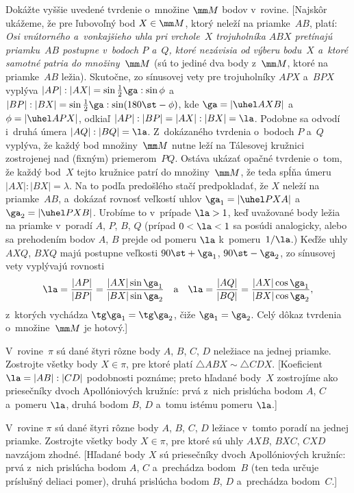 {Dokážte vyššie uvedené tvrdenie o~množine $\mm M$ bodov v~rovine.
[Najskôr ukážeme, že pre ľubovoľný bod $X\in\mm M$, ktorý neleží
na priamke~$AB$, platí:
{\sl Osi vnútorného a~vonkajšieho uhla pri vrchole~$X$
trojuholníka $ABX$ pretínajú priamku~$AB$ postupne v~bodoch $P$ a~$Q$,
ktoré nezávisia od výberu bodu~$X$ a~ktoré samotné patria do množiny~$\mm M$}
(sú to jediné dva body z~$\mm M$, ktoré na priamke~$AB$ ležia).
Skutočne, zo sínusovej vety pre
trojuholníky $APX$ a~$BPX$ vyplýva $|AP|:|AX|=\sin\frac12\ga:\sin\phi$
a~$|BP|:|BX|=\sin\frac12\ga:\sin(180\st-\phi)$, kde
$\ga=|\uhel AXB|$ a~$\phi=|\uhel APX|$,
odkiaľ $|AP|:|BP|=|AX|:|BX|=\la$. Podobne sa odvodí i~druhá
úmera $|AQ|:|BQ|=\la$. Z~dokázaného tvrdenia o~bodoch $P$ a~$Q$
vyplýva, že každý bod množiny~$\mm M$ nutne leží na Tálesovej
kružnici zostrojenej nad (fixným) priemerom~$PQ$. Ostáva ukázať
opačné tvrdenie o~tom, že každý bod~$X$ tejto kružnice patrí do
množiny~$\mm M$, že teda spĺňa úmeru $|AX|:|BX|=\lambda$. Na to podľa
predošlého stačí predpokladať, že $X$ neleží na priamke~$AB$,
a~dokázať rovnosť veľkostí uhlov $\ga_1=|\uhel PXA|$
a~$\ga_2=|\uhel PXB|$. Urobíme to v~prípade $\la>1$, keď
uvažované body ležia na priamke v~poradí $A$, $P$, $B$, $Q$
(prípad $0<\la<1$ sa posúdi analogicky, alebo sa
prehodením bodov $A$, $B$ prejde od pomeru $\la$ k~pomeru~$1/\la$.)
Keďže uhly $AXQ$, $BXQ$ majú postupne veľkosti
$90\st+\ga_1$, $90\st-\ga_2$, zo sínusovej vety vyplývajú rovnosti
$$
\la=\frac{|AP|}{|BP|}=\frac{|AX|\sin\ga_1}{|BX|\sin\ga_2}
\quad\text{a}\quad
\la=\frac{|AQ|}{|BQ|}=\frac{|AX|\cos\ga_1}{|BX|\cos\ga_2},
$$
z~ktorých vychádza $\tg\ga_1=\tg\ga_2$, čiže $\ga_1=\ga_2$. Celý
dôkaz tvrdenia o~množine~$\mm M$ je hotový.]

V~rovine~$\pi$ sú dané štyri rôzne body $A$, $B$, $C$, $D$
neležiace na jednej priamke. Zostrojte všetky body $X\in\pi$,
pre ktoré platí $\triangle ABX\sim \triangle CDX$.
[Koeficient $\la=|AB|:|CD|$ podobnosti poznáme;
preto hľadané body~$X$ zostrojíme ako priesečníky dvoch Apollóniových
kružníc: prvá z~nich prislúcha bodom $A$, $C$ a~pomeru $\la$,
druhá bodom $B$, $D$ a~tomu istému pomeru $\la$.]

V~rovine $\pi$ sú dané štyri rôzne body $A$, $B$, $C$, $D$
ležiace v~tomto poradí na jednej priamke.
Zostrojte všetky body $X\in\pi$, pre ktoré sú uhly
$AXB$, $BXC$, $CXD$ navzájom zhodné. [Hľadané body $X$ sú
priesečníky dvoch Apollóniových kružníc: prvá z~nich prislúcha bodom
$A$, $C$ a~prechádza bodom~$B$ (ten teda určuje príslušný deliaci
pomer), druhá prislúcha bodom $B$, $D$
a~prechádza bodom~$C$.]
}

